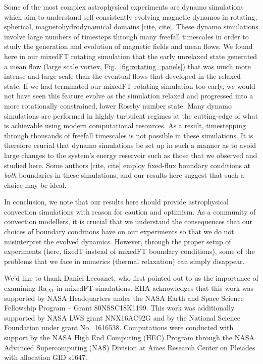 \documentclass[aps, pre, onecolumn, nofootinbib, notitlepage, groupedaddress, amsfonts, amssymb, amsmath, longbibliography, superscriptaddress]{revtex4-1}
\begin{document}
Some of the most complex astrophysical experiments are dynamo simulations which aim to understand self-consistently evolving magnetic dynamos in rotating, spherical, magnetohydrodynamical domains [cite, cite].
These dynamo simulations involve large numbers of timesteps through many freefall timescales in order to study the generation and evolution of magnetic fields and mean flows.
We found here in our mixedFT rotating simulation that the early unrelaxed state generated a mean flow (large scale vortex, Fig.~\ref{fig:rotating_panels}) that was much more intense and large-scale than the eventual flows that developed in the relaxed state.
If we had terminated our mixedFT rotating simulation too early, we would not have seen this feature evolve as the simulation relaxed and progressed into a more rotationally constrained, lower Rossby number state.
Many dynamo simulations are performed in highly turbulent regimes at the cutting-edge of what is achievable using modern computational resources.
As a result, timestepping through thousands of freefall timescales is not possible in these simulations.
It is therefore crucial that dynamo simulations be set up in such a manner as to avoid large changes to the system's energy reservoir such as those that we observed and studied here.
Some authors [cite, cite] employ fixed-flux boundary conditions at \emph{both} boundaries in these simulations, and our results here suggest that such a choice may be ideal.

In conclusion, we note that our results here should provide astrophysical convection simulations with reason for caution and optimism.
As a community of convection modellers, it is crucial that we understand the consequences that our choices of boundary conditions have on our experiments so that we do not misinterpret the evolved dynamics.
However, through the proper setup of experiments (here, fixedT instead of mixedFT boundary conditions), some of the problems that we face in numerics (thermal relaxation) can simply disappear.

\begin{acknowledgments}
We'd like to thank Daniel Lecoanet, who first pointed out to us the importance of examining Ra$_{\Delta T}$ in mixedFT simulations. 
EHA acknowledges that this work was supported by NASA Headquarters under the NASA Earth and Space Science Fellowship Program -- Grant 80NSSC18K1199.
This work was additionally supported by NASA LWS grant NNX16AC92G and by the National Science Foundation under grant No.~1616538. 
Computations were conducted with support by the NASA High End Computing (HEC) Program through the NASA  Advanced Supercomputing (NAS) Division at Ames Research Center on Pleiades with allocation GID s1647.
\end{acknowledgments}
\end{document}
